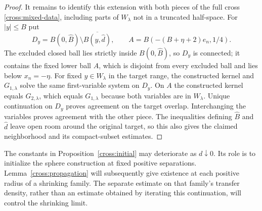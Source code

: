 \begin{proof}
It remains to identify this extension with both pieces of the full
cross \eqref{cross:mixed-data}, including parts of $W_\lambda$ not in
a truncated half-space.  For $|y|\le B$ put
\[
 D_y=B(0,\widehat B)\setminus\overline{B(y,\widehat d)},\qquad
 A=B(-(B+\eta+2)e_n,1/4).
\]
The excluded closed ball lies strictly inside $B(0,\widehat B)$,
so $D_y$ is connected; it contains the fixed lower ball $A$, which
is disjoint from every excluded ball and lies below $x_n=-\eta$.
For fixed $y\in W_\lambda$ in the target range, the constructed kernel
and $G_{1,\lambda}$ solve the same first-variable system on $D_y$.
On $A$ the constructed kernel equals $G_{2,\lambda}$, which equals
$G_{1,\lambda}$ because both variables are in $W_\lambda$.
Unique continuation on $D_y$ proves agreement on the target overlap.
Interchanging the variables proves agreement with the other piece.
The inequalities defining $\widehat B$ and $\widehat d$ leave open
room around the original target, so this also gives the claimed
neighborhood and its compact-subset estimates.
\end{proof}

The constants in Proposition~\ref{cross:initial} may deteriorate as
$d\downarrow0$.  Its role is to initialize the sphere construction at fixed positive
separations.  Lemma~\ref{cross:propagation} will subsequently give
existence at each positive radius of a shrinking family.  The separate
estimate on that family's transfer density, rather than an estimate
obtained by iterating this continuation, will control the shrinking
limit.
